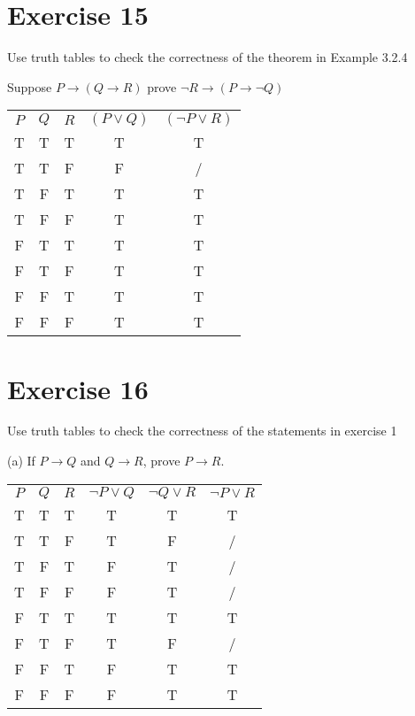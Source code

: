 \documentclass[11pt]{article}
\newcommand{\then}{\rightarrow}
\begin{document}
\section*{Exercise 15}

Use truth tables to check the correctness of the theorem in Example 3.2.4

Suppose $P \then (Q \then R)$ prove $\neg R \then (P \then \neg Q)$

\begin{center}
    \begin{tabular}{ c c c c c }
     $P$ & $Q$ & $R$ & $(P \vee Q)$ & $(\neg P \vee R)$\\ 
    T & T & T & T & T \\  
    T & T & F & F & / \\
    T & F & T & T & T \\  
    T & F & F & T & T \\
    F & T & T & T & T \\  
    F & T & F & T & T \\
    F & F & T & T & T \\  
    F & F & F & T & T 
    \end{tabular}
\end{center}

\section*{Exercise 16}

Use truth tables to check the correctness of the statements in exercise 1

\noindent (a) If $P \then Q$ and $Q \then R$, prove $P \then R$.

\begin{center}
    \begin{tabular}{ c c c c c c }
     $P$ & $Q$ & $R$ & $\neg P \vee Q$ & $\neg Q \vee R$ & $\neg P \vee R$\\ 
    T & T & T & T & T & T\\  
    T & T & F & T & F & /\\
    T & F & T & F & T & /\\  
    T & F & F & F & T & /\\
    F & T & T & T & T & T\\  
    F & T & F & T & F & /\\
    F & F & T & F & T & T\\  
    F & F & F & F & T & T
    \end{tabular}
\end{center}
\end{document}
